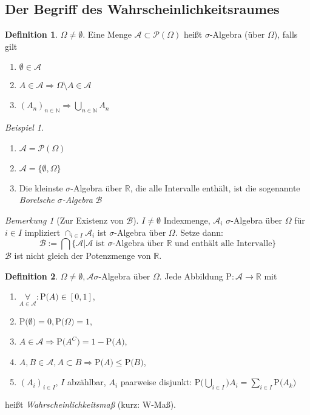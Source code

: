 \documentclass[a4paper,12pt,fleqn]{scrartcl}
\newcommand{\N}{\mathbb{N}}
\newcommand{\R}{\mathbb{R}}
\newcommand{\m}[1]{\mathcal{ #1 }}
\newcommand{\prob}[1]{\text{P(} #1 \text{)}}
\newcommand{\impl}{\Rightarrow}
\newcommand{\fa}[1]{\mathop{\forall}\limits_{#1}}
\theoremstyle{definition}
\newtheorem*{definition}{Definition}
\theoremstyle{plain}
\theoremstyle{remark}
\newtheorem*{bemerkung}{Bemerkung}
\newtheorem*{beispiel}{Beispiel}
\begin{document}
\subsection{Der Begriff des Wahrscheinlichkeitsraumes}
\begin{definition}
$\Omega\neq\emptyset$. Eine Menge $\m{A}\subset\m{P}(\Omega)$  heißt $\sigma$-Algebra (über $\Omega$), falls gilt
\begin{enumerate}
\item $\emptyset\in\m{A}$
\item $A\in\m{A}\impl \Omega\setminus A\in\m{A}$
\item $(A_n)_{n\in\N}\impl\bigcup_{n\in\N}A_n$
\end{enumerate}
\end{definition}
\begin{beispiel}
\begin{enumerate}[a]
\item $\m{A}=\m{P}(\Omega)$
\item $\m{A}=\{\emptyset,\Omega\}$
\item Die kleinste $\sigma$-Algebra über $\R$, die alle Intervalle enthält, ist die sogenannte \emph{Borelsche $\sigma$-Algebra} $\m{B}$
\end{enumerate}
\end{beispiel}
\begin{bemerkung}[Zur Existenz von $\m{B}$]
$I\neq\emptyset$ Indexmenge, $\m{A}_i$ $\sigma$-Algebra über $\Omega$ für $i\in I$ impliziert $\cap_{i\in I}\m{A}_i$ ist $\sigma$-Algebra über $\Omega$. Setze dann:
\[\m{B}:=\bigcap\{\m{A}|\m{A}\text{ ist }\sigma\text{-Algebra über }\R\text{ und enthält alle Intervalle}\}\]
$\m{B}$ ist nicht gleich der Potenzmenge von $\R$.
\end{bemerkung}
\begin{definition}
$\Omega\neq\emptyset,\m{A} \sigma$-Algebra über $\Omega$. Jede Abbildung $\text{P}:\m{A}\to\R$ mit
\begin{enumerate}[i]
\item $\fa{A\in\m{A}}:\prob{A}\in\left[ 0,1\right]$,
\item $\prob{\emptyset}=0,\prob{\Omega}=1$,
\item $A\in\m{A}\impl \prob{A^C}=1-\prob{A}$,
\item $A,B\in\m{A},A\subset B\impl \prob{A}\leq \prob{B}$,
\item $(A_i)_{i\in I}$, $I$ abzählbar, $A_i$ paarweise disjunkt: $\prob{\bigcup_{i\in I}} A_i=\sum_{i\in I}\prob{A_k}$
\end{enumerate}
heißt \emph{Wahrscheinlichkeitsmaß} (kurz: W-Maß).
\end{definition}
\end{document}

